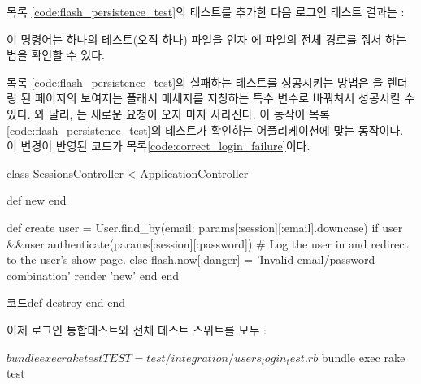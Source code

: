 목록 \ref{code:flash_persistence_test}의 테스트를 추가한 다음 로그인 테스트 결과는 : 

\begin{codelisting}  

 \end{codelisting} 

\noindent 이 명령어는 하나의 테스트(오직 하나) 파일을 인자 에 파일의 전체 경로를 줘서 하는 법을 확인할 수 있다. 

목록 \ref{code:flash_persistence_test}의 실패하는 테스트를 성공시키는 방법은 을 렌더링 된 페이지의 보여지는 플래시 메세지를 지칭하는 특수 변수로 바꿔쳐서 성공시킬 수 있다. 와 달리, 는 새로운 요청이 오자 마자 사라진다. 이 동작이 목록 \ref{code:flash_persistence_test}의 테스트가 확인하는 어플리케이션에 맞는 동작이다. 이 변경이 반영된 코드가 목록\ref{code:correct_login_failure}이다. 

\begin{codelisting} \label{code:correct_login_failure}  

\begin{code} class SessionsController < ApplicationController 

def new end 

def create user = User.find_by(email: params[:session][:email].downcase) if user &&user.authenticate(params[:session][:password]) # Log the user in and redirect to the user's show page. else flash.now[:danger] = 'Invalid email/password combination' render 'new' end end 

코드def destroy end end \end{code} \end{codelisting} 

이제 로그인 통합테스트와 전체 테스트 스위트를 모두 : 

\begin{codelisting}  

\begin{code} $ bundle exec rake test TEST=test/integration/users_login_test.rb $ bundle exec rake test \end{code} \end{codelisting} 

